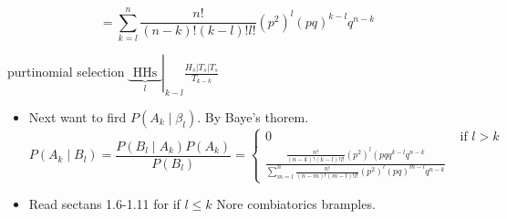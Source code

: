 \documentclass[10pt]{article}
\begin{document}
\[
=\sum_{k=l}^{n} \frac{n!}{(n-k)!(k-l)!l!}\left(p^{2}\right)^{l}(p q)^{k-l} q^{n-k}
\]

purtinomial selection \(\left.\underbrace{\text { HHs }}_{l}\right|_{k-l} \frac{H_{s}\left|T_{s}\right| T_{s}}{T_{k-k}}\)

\begin{itemize}
  \item[-] Next want to fird \(P\left(A_{k} \mid \beta_{l}\right)\). By Baye's thorem.
\[
P\left(A_{k} \mid B_{l}\right)=\frac{P\left(B_{l} \mid A_{k}\right) P\left(A_{k}\right)}{P\left(B_{l}\right)}= \begin{cases}0 & \text { if } l>k \\ \frac{\frac{n!}{(n-k)!(k-l)!l!}\left(p^{2}\right)^{l}\left(p q q^{k-l} q^{n-k}\right.}{\sum_{m=l}^{n} \frac{n!}{(n-m)!(m-l)!l!}\left(p^{2}\right)^{l}(p q)^{m-l} q^{n-k}}\end{cases}
\]
  \item[*] Read sectans 1.6-1.11 for if \(l \leqslant k\) Nore combiatorics bramples.
\end{itemize}
\end{document}
